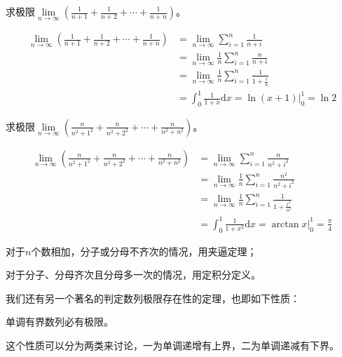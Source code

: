 \documentclass[cn,12pt,chinese]{elegantbook}
\begin{document}
    \begin{example}
        求极限$ \lim\limits_{n \to \infty}(\displaystyle\frac{1}{n+1}+\displaystyle\frac{1}{n+2}+\cdots+\displaystyle\frac{1}{n+n}) $。
    \end{example}
    \begin{solution}
        \begin{align*}
            \lim_{n \to \infty}(\frac{1}{n+1}+\frac{1}{n+2}+\cdots+\frac{1}{n+n})
            &=\lim_{n \to \infty}\sum_{i=1}^n\frac{1}{n+i} \\
            &=\lim_{n \to \infty}\frac{1}{n}\sum_{i=1}^n\frac{n}{n+i}\\
            &=\lim_{n \to \infty}\frac{1}{n}\sum_{i=1}^n\frac{1}{1+\frac{i}{n}}\\
            &= \int_0^1\frac{1}{1+x}\mathrm{d}x=\ln(x+1)\bigg|_{0} ^1=\ln 2
        \end{align*}
    \end{solution}

    \begin{example}
        求极限$ \lim\limits_{n \to \infty}(\displaystyle\frac{n}{n^2+1^2}+\displaystyle\frac{n}{n^2+2^2}+\cdots+\displaystyle\frac{n}{n^2+n^2}) $。
    \end{example}
    \begin{solution}
        \begin{align*}
            \lim_{n \to \infty}(\frac{n}{n^2+1^2}+\frac{n}{n^2+2^2}+\cdots+\frac{n}{n^2+n^2})
            &=\lim_{n \to \infty}\sum_{i=1}^n\frac{n}{n^2+i^2} \\
            &=\lim_{n \to \infty}\frac{1}{n}\sum_{i=1}^n\frac{n^2}{n^2+i^2}\\
            &=\lim_{n \to \infty}\frac{1}{n}\sum_{i=1}^n\frac{1}{1+\frac{i^2}{n^2}}\\
            &= \int_0^1\frac{1}{1+x^2}\mathrm{d}x=\arctan x\bigg|_{0} ^1=\frac{\pi}{4}
        \end{align*}
    \end{solution}
    \begin{note}
        对于$n$个数相加，分子或分母不齐次的情况，用夹逼定理；
        
        对于分子、分母齐次且分母多一次的情况，用定积分定义。
    \end{note}
    我们还有另一个著名的判定数列极限存在性的定理，也即如下性质：
    \begin{property}
        单调有界数列必有极限。
    \end{property}
    这个性质可以分为两类来讨论，一为单调递增有上界，二为单调递减有下界。
\end{document}

